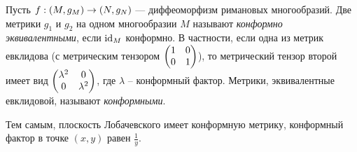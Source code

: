 \documentclass[a4paper]{report}
\begin{document}
    Пусть $f: (M, g_M) \rightarrow (N, g_N)$ --- диффеоморфизм римановых многообразий.
    Две метрики $g_1$ и $g_2$ на одном многообразии $M$ называют \emph{конформно эквивалентными}, если $\operatorname{id}_M$ конформно.
    В частности, если одна из метрик евклидова (с метрическим тензором $\begin{pmatrix}1 & 0 \\ 0 & 1\end{pmatrix}$), то метрический тензор второй имеет вид $\begin{pmatrix}\lambda^2 & 0 \\ 0 & \lambda^2\end{pmatrix}$, где $\lambda$ -- конформный фактор.
    Метрики, эквивалентные евклидовой, называют \emph{конформными}.

    Тем самым, плоскость Лобачевского имеет конформную метрику, конформный фактор в точке $(x, y)$ равен $\frac{1}{y}$.
\end{document}
